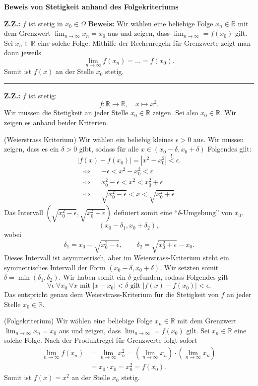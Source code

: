 \documentclass[a4paper,landscape,8pt]{extarticle}
\newcommand{\R}{\mathbb{R}}
\newcommand{\abs}[1]{\left\lvert #1 \right\rvert}
\newcommand{\sep}{\vspace{5pt}\noindent\hrule\vspace{5pt}}
\newcommand{\ZZ}{\textbf{Z.Z.: }}
\newcommand{\Beweis}{\textbf{Beweis: }}
\begin{document}
\begin{multicols*}{4}
\textbf{Beweis von Stetigkeit anhand des Folgekriteriums}

\Vorgehen \ZZ $f$ ist stetig in $x_0\in\Omega$ \Beweis Wir wählen eine beliebige
Folge $x_n\in\R$ mit dem Grenzwert $\lim_{n\to\infty} x_n = x_0$ aus und zeigen,
dass $\lim_{n\to\infty} = f(x_0) $ gilt. Sei $x_n\in\R$ eine solche Folge.
Mithilfe der Rechenregeln für Grenzwerte zeigt man dann jeweils
\[
\lim_{n\to\infty} f(x_n) = \ldots = f(x_0).
\]
Somit ist $f(x)$ an der Stelle $x_0$ stetig.

\begin{warmup} 
\sep

\ZZ $f$ ist stetig:
\[
f\colon \R \to \R, \quad x\mapsto x^2.
\]
Wir müssen die Stetigkeit an jeder Stelle $x_0\in\R$
zeigen. Sei also $x_0\in \R$. Wir zeigen es anhand beider Kriterien.

\Bsp (Weierstrass Kriterium) Wir wählen ein beliebig kleines $\epsilon > 0$
aus. Wir müssen zeigen, dass es ein $\delta > 0$ gibt, sodass für alle $x\in (x_0-\delta,
x_0+\delta)$ Folgendes gilt:
\[
\abs{f(x)-f(x_0)}=\abs{x^2-x_0^2} \stackrel{!}{<} \epsilon.
\]
\begin{align*}
\Longleftrightarrow && -\epsilon < x^2-x_0^2 < \epsilon\\
\Longleftrightarrow && x_0^2-\epsilon < x^2 < x_0^2+\epsilon\\
\Longleftrightarrow && \sqrt{x_0^2-\epsilon} < x < \sqrt{x_0^2+\epsilon}
\end{align*}
Das Intervall $(\sqrt{x_0^2-\epsilon},\sqrt{x_0^2+\epsilon})$ definiert somit
eine ``$\delta$-Umgebung'' von $x_0$.
\[
(x_0-\delta_1,x_0+\delta_2),
\]
wobei
\[\delta_1 = x_0 -\sqrt{x_0^2-\epsilon}, \qquad \delta_2 =
\sqrt{x_0^2+\epsilon} -x_0.
\]
Dieses Intervall ist asymmetrisch, aber im Weierstrass-Kriterium steht ein
symmetrisches Intervall der Form $(x_0-\delta,x_0+\delta)$. Wir setzten somit
$\delta = \min(\delta_1,\delta_2)$. Wir haben somit ein $\delta$ gefunden,
sodass Folgendes gilt
\[
\forall \epsilon \ \forall x_0 \ 
\forall x \text{ mit } \abs{x-x_0}<\delta \text{ gilt }
\abs{f(x)-f(x_0)}<\epsilon.
\]
Das entspricht genau dem Weierstrass-Kriterium für die Stetigkeit von $f$ an
jeder Stelle $x_0\in\R$.

\Bsp (Folgekriterium) Wir wählen eine beliebige Folge $x_n\in\R$ mit dem
Grenzwert $\lim_{n\to\infty} x_n = x_0$ aus und zeigen, dass $\lim_{n\to\infty}
= f(x_0) $ gilt. Sei $x_n\in\R$ eine solche Folge. Nach der Produktregel für
Grenzwerte folgt sofort
\begin{align*}
\lim_{n\to\infty} f(x_n) &= \lim_{n\to\infty} x_n^2
= \left(\lim_{n\to\infty} x_n\right) \cdot \left(\lim_{n\to\infty} x_n\right)\\
&= x_0\cdot x_0 = x_0^2 = f(x_0).
\end{align*}
Somit ist $f(x)=x^2$ an der Stelle $x_0$ stetig.


\end{warmup}
\end{multicols*}
\end{document}
